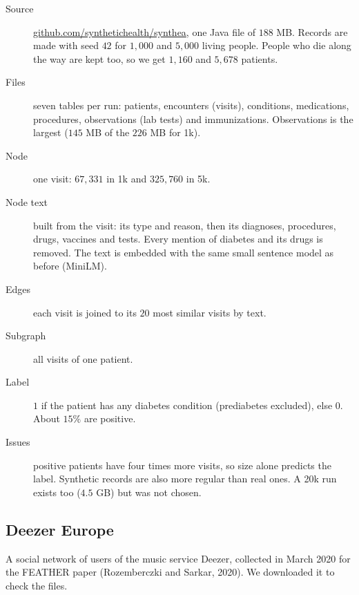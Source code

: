 \documentclass[11pt]{article}
\begin{document}
\begin{description}
\item[Source] \href{https://github.com/synthetichealth/synthea}{github.com/synthetichealth/synthea},
one Java file of $188$ MB. Records are made with seed $42$ for $1{,}000$ and $5{,}000$ living
people. People who die along the way are kept too, so we get $1{,}160$ and $5{,}678$ patients.
\item[Files] seven tables per run: patients, encounters (visits), conditions, medications,
procedures, observations (lab tests) and immunizations. Observations is the largest ($145$ MB
of the $226$ MB for 1k).
\item[Node] one visit: $67{,}331$ in 1k and $325{,}760$ in 5k.
\item[Node text] built from the visit: its type and reason, then its diagnoses, procedures,
drugs, vaccines and tests. Every mention of diabetes and its drugs is removed. The text is
embedded with the same small sentence model as before (MiniLM).
\item[Edges] each visit is joined to its $20$ most similar visits by text.
\item[Subgraph] all visits of one patient.
\item[Label] $1$ if the patient has any diabetes condition (prediabetes excluded), else $0$.
About $15\%$ are positive.
\item[Issues] positive patients have four times more visits, so size alone predicts the label.
Synthetic records are also more regular than real ones. A 20k run exists too ($4.5$ GB) but was
not chosen.
\end{description}

\subsection*{Deezer Europe}

A social network of users of the music service Deezer, collected in March 2020 for the FEATHER
paper (Rozemberczki and Sarkar, 2020). We downloaded it to check the files.
\end{document}
